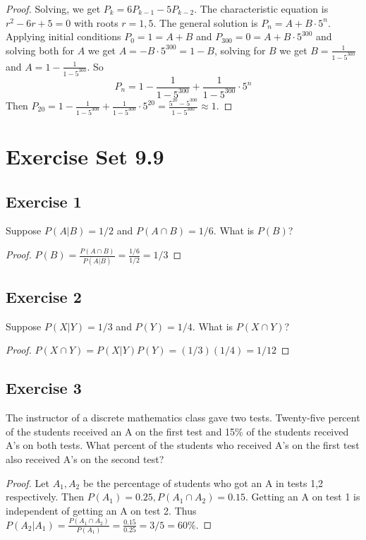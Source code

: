 \documentclass[14pt]{extarticle}
\newcommand{\dps}{\displaystyle}
\begin{document}
\begin{proof}
     Solving, we get \(P_k = 6P_{k-1} - 5P_{k-2}\). The characteristic equation is \(r^2 - 6r + 5 = 0\) with roots
     \(r = 1,5\). The general solution is \(P_n = A+B \cdot 5^n\). Applying initial conditions \(P_0 = 1 = A + B\) and \(P_{300}
     = 0 = A + B \cdot 5^{300}\) and solving both for \(A\) we get \(A = -B \cdot 5^{300} = 1-B\), solving for \(B\) we get
     \(\dps B = \frac{1}{1-5^{300}}\) and \(\dps A = 1 - \frac{1}{1-5^{300}}\). So
     \[
          P_n = 1 - \frac{1}{1-5^{300}} + \frac{1}{1-5^{300}} \cdot 5^n
     \]
     Then \(\dps P_{20}=1-\frac{1}{1-5^{300}} + \frac{1}{1-5^{300}} \cdot 5^{20} = \frac{5^{20}-5^{300}}{1-5^{300}} \approx 1\).
\end{proof}

\section{Exercise Set 9.9}
\subsection{Exercise 1}
Suppose \(P(A|B) = 1/2\) and \(P(A \cap B) = 1/6\). What is \(P(B)\)?

\begin{proof}
     \(P(B) = \frac{P(A \cap B)}{P(A | B)} = \frac{1/6}{1/2} = 1/3\)
\end{proof}

\subsection{Exercise 2}
Suppose \(P(X|Y) = 1/3\) and \(P(Y) = 1/4\). What is \(P(X \cap Y)\)?

\begin{proof}
     \(P(X \cap Y) = P(X|Y)P(Y) = (1/3)(1/4) = 1/12\)
\end{proof}

\subsection{Exercise 3}
The instructor of a discrete mathematics class gave two tests. Twenty-five percent of the students received an A on the first
test and 15\% of the students received A’s on both tests. What percent of the students who received A’s on the first test
also received A’s on the second test?

\begin{proof}
     Let \(A_1, A_2\) be the percentage of students who got an A in tests 1,2 respectively. Then \(P(A_1) = 0.25, P(A_1 \cap A_2)
     = 0.15\). Getting an A on test 1 is independent of getting an A on test 2. Thus \(P(A_2 | A_1) = \frac{P(A_1 \cap A_2)}
     {P(A_1)} = \frac{0.15}{0.25} = 3/5 = 60\%.\)
\end{proof}
\end{document}
